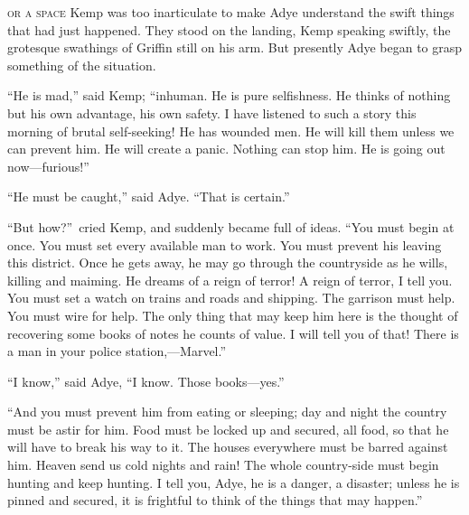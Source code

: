 \label{ch:25}
\begin{ChapterStart}
\vspace*{2\nbs}

\vspace{1.5\nbs}
\vspace{0.75\nbs}
\end{ChapterStart}

\kern-4pt\textsc{or a space} Kemp was too inarticulate to make Adye understand the swift things that had just happened. They stood on the landing, Kemp speaking swiftly, the grotesque swathings of Griffin still on his arm. But presently Adye began to grasp something of the situation.

“He is mad,” said Kemp; “inhuman. He is pure selfishness. He thinks of nothing but his own advantage, his own safety. I have listened to such a story this morning of brutal self-seeking! He has wounded men. He will kill them unless we can prevent him. He will create a panic. Nothing can stop him. He is going out now—furious!”

“He must be caught,” said Adye. “That is certain.”

“But how?”\ cried Kemp, and suddenly became full of ideas. “You must begin at once. You must set every available man to work. You must prevent his leaving this district. Once he gets away, he may go through the countryside as he wills, killing and maiming. He dreams of a reign of terror! A reign of terror, I tell you. You must set a watch on trains and roads and shipping. The garrison must help. You must wire for help. The only thing that may keep him here is the thought of recovering some books of notes he counts of value. I will tell you of that! There is a man in your police station,—Marvel.”

“I know,” said Adye, “I know. Those books—yes.”

“And you must prevent him from eating or sleeping; day and night the country must be astir for him. Food must be locked up and secured, all food, so that he will have to break his way to it. The houses everywhere must be barred against him. Heaven send us cold nights and rain! The whole country-side must begin hunting and keep hunting. I tell you, Adye, he is a danger, a disaster; unless he is pinned and secured, it is frightful to think of the things that may happen.”

